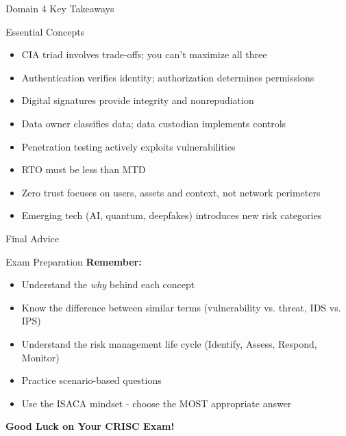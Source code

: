 \documentclass{beamer}
\begin{document}
	\begin{frame}{Domain 4 Key Takeaways}
		\begin{block}{Essential Concepts}
			\begin{itemize}
				\item CIA triad involves trade-offs; you can't maximize all three
				\item Authentication verifies identity; authorization determines permissions
				\item Digital signatures provide integrity and nonrepudiation
				\item Data owner classifies data; data custodian implements controls
				\item Penetration testing actively exploits vulnerabilities
				\item RTO must be less than MTD
				\item Zero trust focuses on users, assets and context, not network perimeters
				\item Emerging tech (AI, quantum, deepfakes) introduces new risk categories
			\end{itemize}
		\end{block}
	\end{frame}
	
	\begin{frame}{Final Advice}
		\begin{block}{Exam Preparation}
			\centering
			\vspace{0.3cm}
			\textbf{Remember:}
			\begin{itemize}
				\item Understand the \textit{why} behind each concept
				\item Know the difference between similar terms (vulnerability vs. threat, IDS vs. IPS)
				\item Understand the risk management life cycle (Identify, Assess, Respond, Monitor)
				\item Practice scenario-based questions
				\item Use the ISACA mindset - choose the MOST appropriate answer
			\end{itemize}
			\vspace{0.5cm}
			\textbf{Good Luck on Your CRISC Exam!}
		\end{block}
	\end{frame}
	
\end{document}
